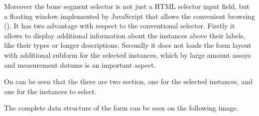 
Moreover the bone segment selector is not just a HTML selector input field, but a floating window implemented by JavaScript that allows the convenient browsing (). It has two advantage with respect to the conventional selector. Firstly it allows to display additional information about the instances above their labels, like their types or longer descriptions. Secondly it does not loads the form layout with additional subform for the selected instances, which by large amount assays and measurement datums is an important aspect.



On  can be seen that the there are two section, one for the selected instances, and one for the instances to select. 


The complete data structure of the form can be seen on the following image.



